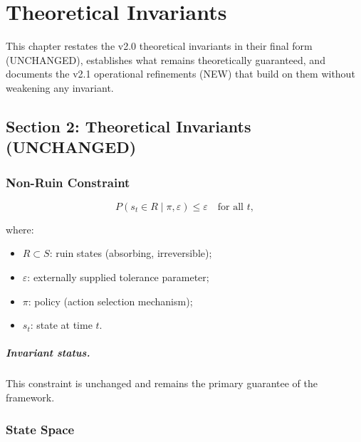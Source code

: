 
\chapter{Theoretical Invariants}
\label{ch:theoretical-invariants}

This chapter restates the v2.0 theoretical invariants in their final
form (UNCHANGED), establishes what remains theoretically guaranteed,
and documents the v2.1 operational refinements (NEW) that build on
them without weakening any invariant.

\section{Section 2: Theoretical Invariants (UNCHANGED)}
\label{sec:invariants-unchanged}

\subsection{Non-Ruin Constraint}
\label{sec:inv-non-ruin}

\begin{equation}
P(s_t \in R \mid \pi, \varepsilon) \le \varepsilon
\quad \text{for all } t,
\label{eq:non-ruin-constraint}
\end{equation}

\noindent
where:
\begin{itemize}
\item $R \subset S$: ruin states (absorbing, irreversible);
\item $\varepsilon$: externally supplied tolerance parameter;
\item $\pi$: policy (action selection mechanism);
\item $s_t$: state at time $t$.
\end{itemize}

\paragraph{Invariant status.}
This constraint is unchanged and remains the primary guarantee of
the framework.

\subsection{State Space}
\label{sec:inv-state-space}

